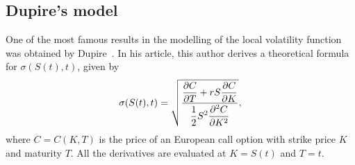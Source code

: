 \subsection{Dupire's model}
\label{subsection:Dupire}
One of the most famous results in the modelling of the local volatility function was obtained by Dupire~\citep{Dupire}. In his article, this author derives a theoretical formula for $\sigma(S(t),t)$, given by
\begin{equation}\label{dupire}
\sigma(S(t),t)=\sqrt{\frac{\displaystyle\pdv{C}{T}+rS\pdv{C}{K}}{\displaystyle\frac{1}{2}S^2\pdv{^2C}{K^2}}},
\end{equation}
\noindent where $C=C(K,T)$ is the price of an European call option with strike price $K$ and maturity $T$. All the derivatives are evaluated at $K=S(t)$ and $T=t$.



